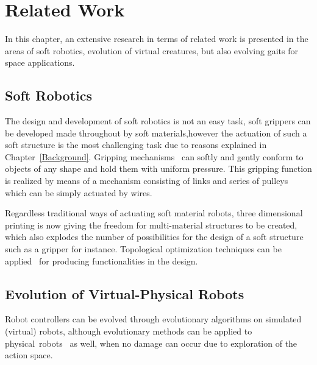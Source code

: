 
\chapter{Related Work} %

\label{Related Work} %


In this chapter, an extensive research in terms of related work is presented in the areas of soft robotics, evolution of virtual creatures, but also evolving gaits for space applications.





\section{Soft Robotics}

The design and development of soft robotics is not an easy task, soft grippers can be developed  made throughout by soft materials,however the actuation of such a soft structure is the most challenging task due to reasons explained in Chapter~\ref{Background}. Gripping mechanisms~\cite{hirose1978development} can softly and gently conform to objects of any shape and hold them with uniform pressure. This gripping function is realized by means of a mechanism consisting of links and series of pulleys which can be simply actuated by wires.

Regardless traditional ways of actuating soft material robots, three dimensional printing is now giving the freedom for multi-material structures to be created, which also explodes the number of possibilities for the design of a soft structure such as a gripper for instance. Topological optimization techniques can be applied~\cite{hiller2009multi} for producing functionalities in the design.


\section{Evolution of Virtual-Physical Robots}

Robot controllers can be evolved through evolutionary algorithms on simulated (virtual) robots, although evolutionary methods can be applied to physical~robots~\cite{nolfi1994evolve} as well, when no damage can occur due to exploration of the action space. 

